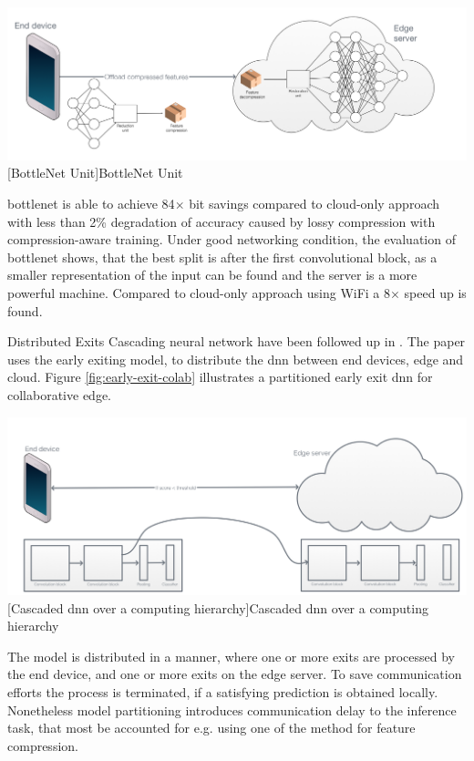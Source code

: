 \begin{enumdescript}
	\begin{minipage}[t]{\linewidth}
		\centering
		\includegraphics[width=.8\linewidth]{figures/models/bottlenet}
		[BottleNet Unit]{BottleNet Unit}
	\end{minipage}

	\gls{bottlenet} is able to achieve 84$\times$ bit savings compared to cloud-only approach with less than 2\% degradation of accuracy caused by lossy compression with compression-aware training. Under good networking condition, the evaluation of \gls{bottlenet} shows, that the best split is after the first convolutional block, as a smaller representation of the input can be found and the server is a more powerful machine. Compared to cloud-only approach using WiFi a 8$\times$ speed up is found. 
	
	\item[Distributed Exits] Cascading neural network have been followed up in \cite{leroux_cascading_2017}. The paper uses the early exiting model, to distribute the \gls{dnn} between end devices, edge and cloud. Figure \ref{fig:early-exit-colab} illustrates a partitioned early exit \gls{dnn} for collaborative edge. 
	
	\begin{minipage}[t]{\linewidth}
		\centering
		\includegraphics[width=\linewidth]{figures/models/cascaded}
		[Cascaded \gls{dnn} over a computing hierarchy]{Cascaded \gls{dnn} over a computing hierarchy}
		\label{fig:early-exit-colab}
	\end{minipage}
	The model is distributed in a manner, where one or more exits are processed by the end device, and one or more exits on the edge server. To save communication efforts the process is terminated, if a satisfying prediction is obtained locally. Nonetheless model partitioning introduces communication delay to the inference task, that most be accounted for e.g. using one of the method for feature compression.
	

\end{enumdescript}
